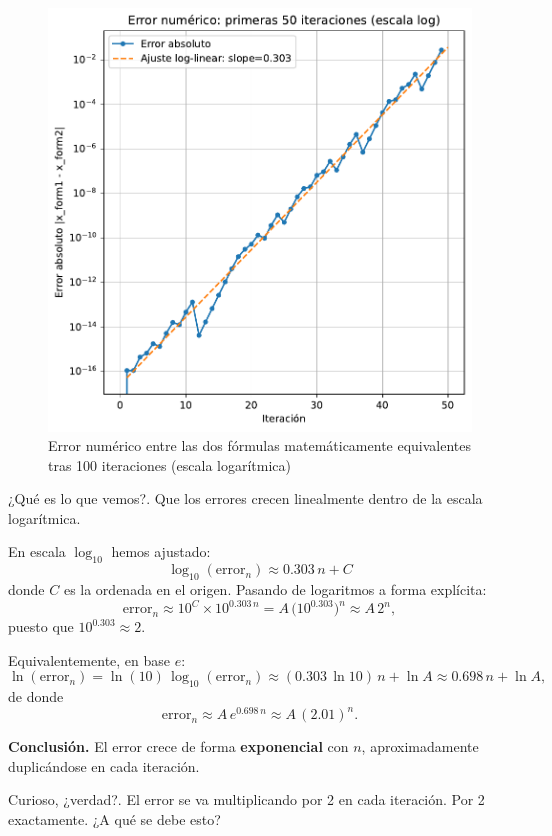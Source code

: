 \documentclass[
  10pt,
  a4paper,
  DIV=11,
  numbers=noendperiod,
  open=any]{scrreprt}
\numberwithin{equation}{chapter}
\numberwithin{equation}{section}
\renewcommand{\[}{\begin{equation}}
\renewcommand{\]}{\end{equation}}
\begin{document}
\begin{figure}[h]
  \centering
  \includegraphics[keepaspectratio]{01-logistica/lyapunov_files/figure-pdf/cell-9-output-1.pdf}
  \caption{Error numérico entre las dos fórmulas matemáticamente equivalentes tras 100 iteraciones (escala logarítmica)}
\end{figure}  


¿Qué es lo que vemos?. Que los errores crecen linealmente dentro de la
escala logarítmica.

En escala \(\log_{10}\) hemos ajustado: \[
\log_{10}(\mathrm{error}_n)\approx 0.303\,n + C
\] donde \(C\) es la ordenada en el origen. Pasando de logaritmos a
forma explícita: \[
\mathrm{error}_n \approx 10^C \times 10^{0.303\,n}
= A\,\bigl(10^{0.303}\bigr)^n
\approx A\,2^n,
\] puesto que \(10^{0.303}\approx2\).

Equivalentemente, en base \(e\): \[
\ln(\mathrm{error}_n)
= \ln(10)\,\log_{10}(\mathrm{error}_n)
\approx (0.303\,\ln 10)\,n + \ln A
\approx 0.698\,n + \ln A,
\] de donde \[
\mathrm{error}_n \approx A\,e^{0.698\,n}\approx A\,(2.01)^n.
\]

\textbf{Conclusión.} El error crece de forma \textbf{exponencial} con
\(n\), aproximadamente duplicándose en cada iteración.

Curioso, ¿verdad?. El error se va multiplicando por 2 en cada iteración.
Por 2 exactamente. ¿A qué se debe esto?
\end{document}
